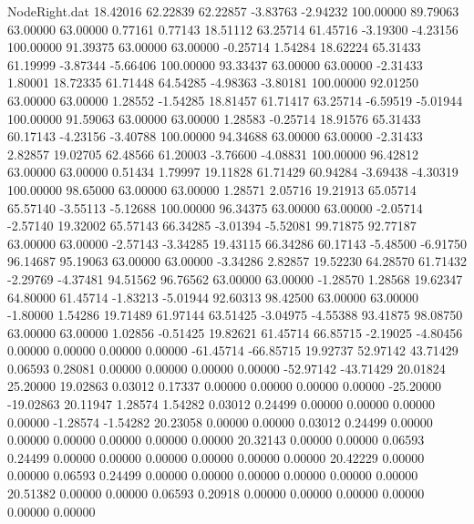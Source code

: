 \begin{filecontents}{NodeRight.dat}
  18.42016   62.22839   62.22857    -3.83763   -2.94232  100.00000   89.79063   63.00000   63.00000    0.77161    0.77143
  18.51112   63.25714   61.45716    -3.19300   -4.23156  100.00000   91.39375   63.00000   63.00000   -0.25714    1.54284
  18.62224   65.31433   61.19999    -3.87344   -5.66406  100.00000   93.33437   63.00000   63.00000   -2.31433    1.80001
  18.72335   61.71448   64.54285    -4.98363   -3.80181  100.00000   92.01250   63.00000   63.00000    1.28552   -1.54285
  18.81457   61.71417   63.25714    -6.59519   -5.01944  100.00000   91.59063   63.00000   63.00000    1.28583   -0.25714
  18.91576   65.31433   60.17143    -4.23156   -3.40788  100.00000   94.34688   63.00000   63.00000   -2.31433    2.82857
  19.02705   62.48566   61.20003    -3.76600   -4.08831  100.00000   96.42812   63.00000   63.00000    0.51434    1.79997
  19.11828   61.71429   60.94284    -3.69438   -4.30319  100.00000   98.65000   63.00000   63.00000    1.28571    2.05716
  19.21913   65.05714   65.57140    -3.55113   -5.12688  100.00000   96.34375   63.00000   63.00000   -2.05714   -2.57140
  19.32002   65.57143   66.34285    -3.01394   -5.52081   99.71875   92.77187   63.00000   63.00000   -2.57143   -3.34285
  19.43115   66.34286   60.17143    -5.48500   -6.91750   96.14687   95.19063   63.00000   63.00000   -3.34286    2.82857
  19.52230   64.28570   61.71432    -2.29769   -4.37481   94.51562   96.76562   63.00000   63.00000   -1.28570    1.28568
  19.62347   64.80000   61.45714    -1.83213   -5.01944   92.60313   98.42500   63.00000   63.00000   -1.80000    1.54286
  19.71489   61.97144   63.51425    -3.04975   -4.55388   93.41875   98.08750   63.00000   63.00000    1.02856   -0.51425
  19.82621   61.45714   66.85715    -2.19025   -4.80456    0.00000    0.00000    0.00000    0.00000  -61.45714  -66.85715
  19.92737   52.97142   43.71429     0.06593    0.28081    0.00000    0.00000    0.00000    0.00000  -52.97142  -43.71429
  20.01824   25.20000   19.02863     0.03012    0.17337    0.00000    0.00000    0.00000    0.00000  -25.20000  -19.02863
  20.11947    1.28574    1.54282     0.03012    0.24499    0.00000    0.00000    0.00000    0.00000   -1.28574   -1.54282
  20.23058    0.00000    0.00000     0.03012    0.24499    0.00000    0.00000    0.00000    0.00000    0.00000    0.00000
  20.32143    0.00000    0.00000     0.06593    0.24499    0.00000    0.00000    0.00000    0.00000    0.00000    0.00000
  20.42229    0.00000    0.00000     0.06593    0.24499    0.00000    0.00000    0.00000    0.00000    0.00000    0.00000
  20.51382    0.00000    0.00000     0.06593    0.20918    0.00000    0.00000    0.00000    0.00000    0.00000    0.00000
\end{filecontents}
